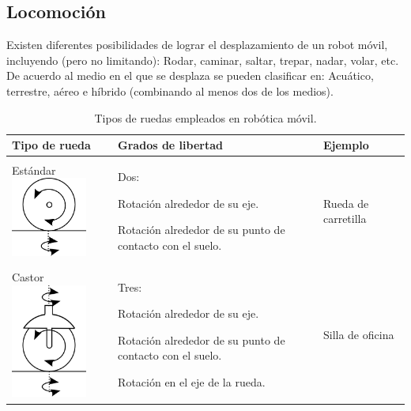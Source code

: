\subsection{Locomoción}
\label{ssec:loc}
Existen diferentes posibilidades de lograr el desplazamiento de un robot móvil, incluyendo (pero no limitando): Rodar, caminar, saltar, trepar, nadar, volar, etc. De acuerdo al medio en el que se desplaza se pueden clasificar en: Acuático, terrestre, aéreo e híbrido (combinando al menos dos de los medios).
\begin{table}[htbp!]
	\caption{Tipos de ruedas empleados en robótica móvil.}
	\label{tab:ruedas}
	\begin{center}
		\begin{tabular}{|p{3cm}|p{7cm}|p{4cm}|}
			\hline
			{\bf Tipo de rueda} & {\bf Grados de libertad} & {\bf Ejemplo}\\
			\hline
			Estándar \includegraphics[width=2.5cm]{./Figuras/REstan.png} & Dos:
			\begin{compactitem}
				\item Rotación alrededor de su eje.
				\item Rotación alrededor de su punto de contacto con el suelo.
			\end{compactitem} & Rueda de carretilla\\
			\hline
			Castor \includegraphics[width=2.5cm]{./Figuras/Castor.png} & Tres:
			\begin{compactitem}
				\item Rotación alrededor de su eje.
				\item Rotación alrededor de su punto de contacto con el suelo.
				\item Rotación en el eje de la rueda.
			\end{compactitem} & Silla de oficina\\
			\hline

\end{tabular}
\end{center}
\end{table}
